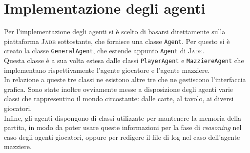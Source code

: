 \chapter*{Implementazione degli agenti}
\graphicspath{{Chapter5/Chapter5Figs/PNG/}{Chapter5/Chapter5Figs/PDF/}{Chapter5/Chapter5Figs/}}



Per l'implementazione degli agenti si è scelto di basarsi direttamente sulla piattaforma \textsc{Jade} sottostante, che fornisce una classe \texttt{Agent}.
Per questo si è creato la classe \texttt{GeneralAgent}, che estende appunto \texttt{Agent} di \textsc{Jade}.\\
Questa classe è a sua volta estesa dalle classi \texttt{PlayerAgent} e \texttt{MazziereAgent} che implementano rispettivamente l'agente giocatore e l'agente mazziere.\\
In relazione a queste tre classi ne esistono altre tre che ne gestiscono l'interfaccia grafica.
Sono state inoltre ovviamente messe a disposizione degli agenti varie classi che rappresentino il mondo circostante: dalle carte, al tavolo, ai diversi giocatori.\\
Infine, gli agenti dispongono di classi utilizzate per mantenere la memoria della partita, in modo da poter usare queste informazioni per la fase di \emph{reasoning} nel caso degli agenti giocatori, oppure per redigere il file di log nel caso dell'agente mazziere.
